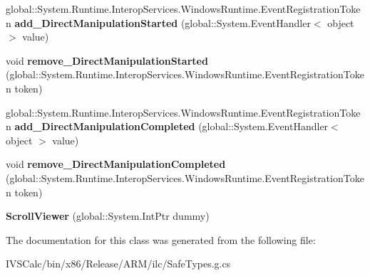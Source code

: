 \begin{DoxyCompactItemize}
\item 
\mbox{\label{class_windows_1_1_u_i_1_1_xaml_1_1_controls_1_1_scroll_viewer_adab47141d357f03365676f3c0dc8360c}} 
global\+::\+System.\+Runtime.\+Interop\+Services.\+Windows\+Runtime.\+Event\+Registration\+Token {\bfseries add\+\_\+\+Direct\+Manipulation\+Started} (global\+::\+System.\+Event\+Handler$<$ object $>$ value)
\item 
\mbox{\label{class_windows_1_1_u_i_1_1_xaml_1_1_controls_1_1_scroll_viewer_a34f553f86c580da23d4109f5e64d47bc}} 
void {\bfseries remove\+\_\+\+Direct\+Manipulation\+Started} (global\+::\+System.\+Runtime.\+Interop\+Services.\+Windows\+Runtime.\+Event\+Registration\+Token token)
\item 
\mbox{\label{class_windows_1_1_u_i_1_1_xaml_1_1_controls_1_1_scroll_viewer_a5700eed19403dac498a6b0e4c2164043}} 
global\+::\+System.\+Runtime.\+Interop\+Services.\+Windows\+Runtime.\+Event\+Registration\+Token {\bfseries add\+\_\+\+Direct\+Manipulation\+Completed} (global\+::\+System.\+Event\+Handler$<$ object $>$ value)
\item 
\mbox{\label{class_windows_1_1_u_i_1_1_xaml_1_1_controls_1_1_scroll_viewer_abfd26932c4679f145e20ab03785ea8be}} 
void {\bfseries remove\+\_\+\+Direct\+Manipulation\+Completed} (global\+::\+System.\+Runtime.\+Interop\+Services.\+Windows\+Runtime.\+Event\+Registration\+Token token)
\item 
\mbox{\label{class_windows_1_1_u_i_1_1_xaml_1_1_controls_1_1_scroll_viewer_ae43835a1ae5cf186b95dbddb1dec3e35}} 
{\bfseries Scroll\+Viewer} (global\+::\+System.\+Int\+Ptr dummy)
\end{DoxyCompactItemize}


The documentation for this class was generated from the following file\+:\begin{DoxyCompactItemize}
\item 
I\+V\+S\+Calc/bin/x86/\+Release/\+A\+R\+M/ilc/Safe\+Types.\+g.\+cs\end{DoxyCompactItemize}
